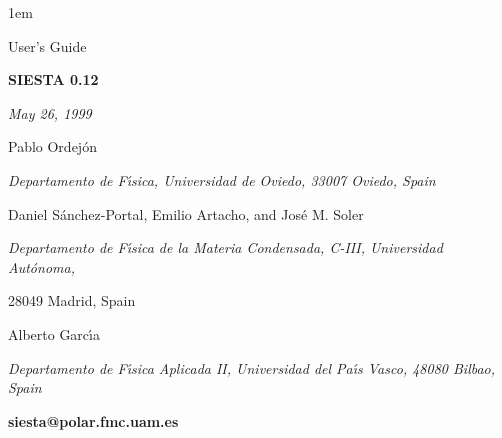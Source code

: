  


\textheight 22cm
\textwidth 16cm
\oddsidemargin 1mm
\topmargin -15mm

\makeindex

\baselineskip=14pt
\parskip 5pt
\parindent 1em




\begin{titlepage}

\begin{center}

\vspace{1cm}

{\huge {\sc User's Guide}}

\vspace{3cm}

{\Huge {\bf SIESTA 0.12}}

\vspace{3cm}

{\Large {\it May 26, 1999} }

\vspace{3cm}

{\Large Pablo Ordej\'on}

\vspace{5pt}

{\it Departamento de F\'{\i}sica, Universidad de
Oviedo, 33007 Oviedo, Spain}

\vspace{7mm}

{\Large Daniel S\'anchez-Portal, Emilio Artacho, and Jos\'e M. Soler}

\vspace{5pt}
 
{\it Departamento de F\'{\i}sica de la Materia Condensada, C-III,
Universidad Aut\'onoma, 

28049 Madrid, Spain} 

\vspace{7mm}

{\Large Alberto Garc\'{\i}a}

\vspace{5pt}

{\it Departamento de F\'{\i}sica Aplicada II,
Universidad del Pa\'{\i}s Vasco, 48080 Bilbao, Spain}


\vspace{2cm}
{\bf siesta@polar.fmc.uam.es}

\end{center}

\end{titlepage}


